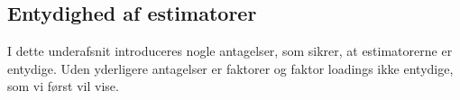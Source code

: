 %

\subsection{Entydighed af estimatorer}
I dette underafsnit introduceres nogle antagelser, som sikrer, at estimatorerne er entydige.
Uden yderligere antagelser er faktorer og faktor loadings ikke entydige, som vi først vil vise. 

